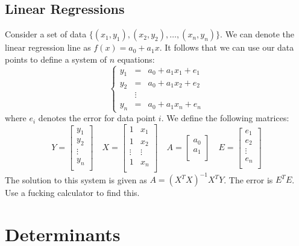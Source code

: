 \section{Linear Regressions}
Consider a set of data \(\{ (x_1,y_1),(x_2,y_2),\ldots,(x_n,y_n) \} \). We can denote the linear regression line as \(f(x)=a_0+a_1 x\). It follows that we can use our data points to define a system of \(n\) equations:
\[
    \left\{\begin{array}{ccc}
        y_1&=&a_0 +a_1x_1 +e_1\\
        y_2&=&a_0 + a_1 x_2 + e_2\\
        &\vdots&\\
        y_n&=& a_0 + a_1 x_n + e_n
    \end{array}\right.
\]
where \(e_i\) denotes the error for data point \(i\). We define the following matrices:
\[
    Y=\begin{bmatrix}
         y_1 \\
          y_2\\
          \vdots\\
y_n          \\
    \end{bmatrix}\quad X=\begin{bmatrix}
        1 &x_1   \\
         1&x_2   \\
         \vdots&\vdots   \\
         1&x_n   \\
    \end{bmatrix}\quad A=\begin{bmatrix}
         a_0 \\
          a_1\\
    \end{bmatrix}\quad E=\begin{bmatrix}
         e_1 \\
          e_2\\
          \vdots\\
          e_n\\
    \end{bmatrix}
\]
The solution to this system is given as \(A=(X^T X)^{-1}  X^T Y\). The error is \(E^T E\). Use a fucking calculator to find this.
\newpage
\chapter{Determinants}
